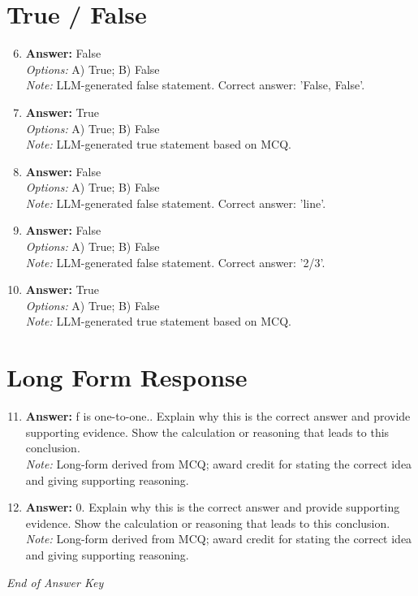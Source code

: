 \documentclass[12pt]{article}
\begin{document}
\section*{True / False}
\begin{enumerate}[label=\arabic*.]
\setcounter{enumi}{5}
\item \textbf{Answer:} False
\\ \textit{Options:} A) True; B) False
\\ \textit{Note:} LLM-generated false statement. Correct answer: 'False, False'.
\item \textbf{Answer:} True
\\ \textit{Options:} A) True; B) False
\\ \textit{Note:} LLM-generated true statement based on MCQ.
\item \textbf{Answer:} False
\\ \textit{Options:} A) True; B) False
\\ \textit{Note:} LLM-generated false statement. Correct answer: 'line'.
\item \textbf{Answer:} False
\\ \textit{Options:} A) True; B) False
\\ \textit{Note:} LLM-generated false statement. Correct answer: '2/3'.
\item \textbf{Answer:} True
\\ \textit{Options:} A) True; B) False
\\ \textit{Note:} LLM-generated true statement based on MCQ.
\end{enumerate}

\section*{Long Form Response}
\begin{enumerate}[label=\arabic*.]
\setcounter{enumi}{10}
\item \textbf{Answer:} f is one-to-one.. Explain why this is the correct answer and provide supporting evidence. Show the calculation or reasoning that leads to this conclusion.
\\ \textit{Note:} Long-form derived from MCQ; award credit for stating the correct idea and giving supporting reasoning.
\item \textbf{Answer:} 0. Explain why this is the correct answer and provide supporting evidence. Show the calculation or reasoning that leads to this conclusion.
\\ \textit{Note:} Long-form derived from MCQ; award credit for stating the correct idea and giving supporting reasoning.
\end{enumerate}

\vfill
\noindent\textit{End of Answer Key}
\end{document}
